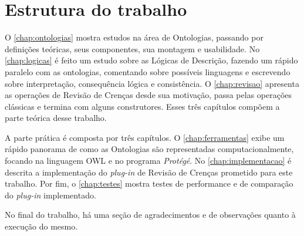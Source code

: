 \section{Estrutura do trabalho}

O \autoref{chap:ontologias} mostra estudos na área de Ontologias, passando por definições teóricas, seus componentes, sua montagem e usabilidade. No \autoref{chap:logicas} é feito um estudo sobre as Lógicas de Descrição, fazendo um rápido paralelo com as ontologias, comentando sobre possíveis linguagens e escrevendo sobre interpretação, consequência lógica e consistência. O \autoref{chap:revisao} apresenta as operações de Revisão de Crenças desde sua motivação, passa pelas operações clássicas e termina com alguns construtores. Esses três capítulos compõem a parte teórica desse trabalho.

A parte prática é composta por três capítulos. O \autoref{chap:ferramentas} exibe um rápido panorama de como as Ontologias são representadas computacionalmente, focando na linguagem OWL e no programa \textit{Protégé}. No \autoref{chap:implementacao} é descrita a implementação do \textit{plug-in} de Revisão de Crenças prometido para este trabalho. Por fim, o \autoref{chap:testes} mostra testes de performance e de comparação do \textit{plug-in} implementado.

No final do trabalho, há uma seção de agradecimentos e de observações quanto à execução do mesmo.